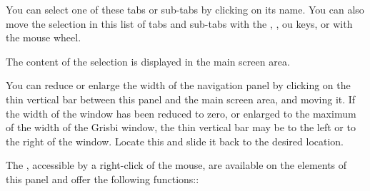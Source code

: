 
You can select one of these tabs or sub-tabs by clicking on its name. You can also move the selection in this list of tabs and sub-tabs with the , ,  ou  keys, or with the mouse wheel. 

The content of the selection is displayed in the main screen area.

You can reduce or enlarge the width of the navigation panel by clicking on the thin vertical bar between this panel and the main screen area, and moving it. If the width of the window has been reduced to zero, or enlarged to the maximum of the width of the Grisbi window, the thin vertical bar may be to the left or to the right of the window.  Locate this and slide it back to the desired location.


The ,  accessible by a right-click of the mouse, are available on the elements of this panel and offer the following functions::

